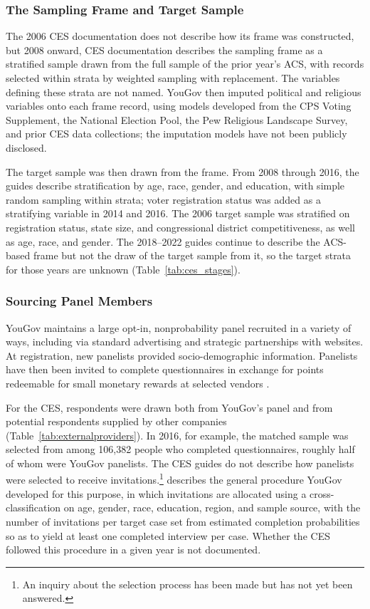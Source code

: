 \documentclass[12pt]{article}
\begin{document}
\subsubsection*{The Sampling Frame and Target Sample}

The 2006 CES documentation does not describe how its frame was constructed, but 2008 onward, CES documentation describes the sampling frame as a stratified sample drawn from the full sample of the prior year's ACS, with records selected within strata by weighted sampling with replacement. The variables defining these strata are not named. YouGov then imputed political and religious variables onto each frame record, using models developed from the CPS Voting Supplement, the National Election Pool, the Pew Religious Landscape Survey, and prior CES data collections; the imputation models have not been publicly disclosed. 

The target sample was then drawn from the frame. From 2008 through 2016, the guides describe stratification by age, race, gender, and education, with simple random sampling within strata; voter registration status was added as a stratifying variable in 2014 and 2016. The 2006 target sample was stratified on registration status, state size, and congressional district competitiveness, as well as age, race, and gender. The 2018--2022 guides continue to describe the ACS-based frame but not the draw of the target sample from it, so the target strata for those years are unknown (Table~\ref{tab:ces_stages}).

\subsubsection*{Sourcing Panel Members}
YouGov maintains a large opt-in, nonprobability panel recruited in a variety of ways, including via standard advertising and strategic partnerships with websites. At registration, new panelists provided socio-demographic information. Panelists have then been invited to complete questionnaires in exchange for points redeemable for small monetary rewards at selected vendors \parencite{yougov_methodology}.

For the CES, respondents were drawn both from YouGov's panel and from potential respondents supplied by other companies (Table~\ref{tab:externalproviders}). In 2016, for example, the matched sample was selected from among 106,382 people who completed questionnaires, roughly half of whom were YouGov panelists. The CES guides do not describe how panelists were selected to receive invitations.\footnote{An inquiry about the selection process has been made but has not yet been answered.} \textcite{rivers_sample_2006} describes the general procedure YouGov developed for this purpose, in which invitations are allocated using a cross-classification on age, gender, race, education, region, and sample source, with the number of invitations per target case set from estimated completion probabilities so as to yield at least one completed interview per case. Whether the CES followed this procedure in a given year is not documented.
\end{document}
